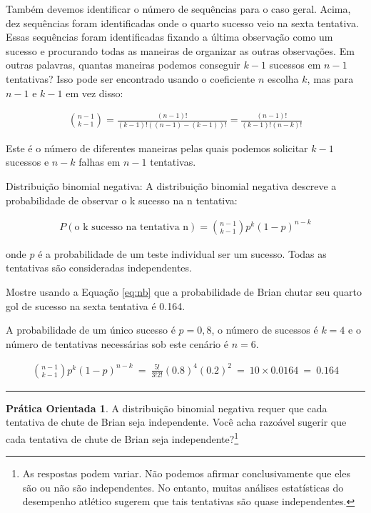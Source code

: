 \documentclass[
]{book}
\theoremstyle{definition}
\theoremstyle{definition}
\theoremstyle{definition}
\newtheorem{exercise}{Prática Orientada}[chapter]
\theoremstyle{definition}
\theoremstyle{remark}
\begin{document}
Também devemos identificar o número de sequências para o caso geral. Acima, dez sequências foram identificadas onde o quarto sucesso veio na sexta tentativa. Essas sequências foram identificadas fixando a última observação como um sucesso e procurando todas as maneiras de organizar as outras observações. Em outras palavras, quantas maneiras podemos conseguir \(k-1\) sucessos em \(n-1\) tentativas? Isso pode ser encontrado usando o coeficiente \(n\) escolha \(k\), mas para \(n-1\) e \(k-1\) em vez disso:

\begin{eqnarray*}
{n-1 \choose k-1} = \frac{(n-1)!}{(k-1)! \left((n-1) - (k-1)\right)!} = \frac{(n-1)!}{(k-1)! \left(n - k\right)!}
\end{eqnarray*}

Este é o número de diferentes maneiras pelas quais podemos solicitar \(k-1\) sucessos e \(n-k\) falhas em \(n-1\) tentativas.

Distribuição binomial negativa: A distribuição binomial negativa descreve a probabilidade de observar o k sucesso na n tentativa:

\begin{eqnarray}
P(\text{o k sucesso na tentativa n}) = {n-1 \choose k-1} p^{k}(1-p)^{n-k}
\label{eq:nb}
\end{eqnarray}

onde \(p\) é a probabilidade de um teste individual ser um sucesso. Todas as tentativas são consideradas independentes.

Mostre usando a Equação \eqref{eq:nb} que a probabilidade de Brian chutar seu quarto gol de sucesso na sexta tentativa é 0.164.

A probabilidade de um único sucesso é \(p=0,8\), o número de sucessos é \(k=4\) e o número de tentativas necessárias sob este cenário é \(n=6\).

\begin{align*}
{n-1 \choose k-1}p^k(1-p)^{n-k}\ 
    =\ \frac{5!}{3!2!} (0.8)^4 (0.2)^2\ 
    =\ 10\times 0.0164\ 
    =\ 0.164
\end{align*}

\begin{center}\rule{0.5\linewidth}{0.5pt}\end{center}

\begin{exercise}
\protect\hypertarget{exr:unnamed-chunk-145}{}{\label{exr:unnamed-chunk-145} }A distribuição binomial negativa requer que cada tentativa de chute de Brian seja independente. Você acha razoável sugerir que cada tentativa de chute de Brian seja independente?\footnote{As respostas podem variar. Não podemos afirmar conclusivamente que eles são ou não são independentes. No entanto, muitas análises estatísticas do desempenho atlético sugerem que tais tentativas são quase independentes.}
\end{exercise}
\end{document}
